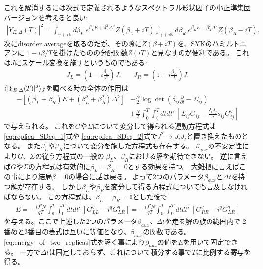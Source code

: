 これを解消するには次式で定義されるようなスペクトラル形状因子の小正準集団バージョンを考えると良い:
\begin{align}
	|Y_{E, \Delta}(T)|^2
	= \int_{\gamma + i\mathbb{R}}d\beta_L\ e^{\beta_LE + \beta_L^2\Delta^2}Z(\beta_L + iT)
	\int_{\gamma + i\mathbb{R}}d\beta_R\ e^{\beta_RE + \beta_R^2\Delta^2}Z(\beta_R - iT).
\end{align}
次にdisorder averageを取るのだが、その際に$Z(\beta + iT)$を、SYKのハミルトニアンに
$1 - i\beta / T$を掛けたものの分配関数$Z(iT)$と見なすのが便利である。
これは$J$にスケール変換を施すというものでもある:
\begin{align}
	J_L = \left(1 - i\frac{\beta_L}{T}\right)J,\hspace{20pt}
	J_R = \left(1 + i\frac{\beta_R}{T}\right)J.
\end{align}
$\langle |Y_{E,\Delta}(T)|^2 \rangle_J$を調べる時の全体の作用は
\begin{align}
	-\left[(\beta_L + \beta_R)E + (\beta_L^2 + \beta_R^2)\Delta^2\right]
	&-\frac{N}{2}\log\det\left(\delta_{ij}\frac{\partial}{\partial t}
	- \Sigma_{ij}\right)\nonumber\\
	&+\frac{N}{2}\int_0^T\int_0^T dtdt'\ 
		\left[\Sigma_{ij}G_{ij} - \frac{J_iJ_j}{q}s_{ij}G_{ij}^q\right]
\end{align}
で与えられる。
これを$G$や$\Sigma$について変分して得られる運動方程式は\eqref{eq:replica_SDeq_1}式や
\eqref{eq:replica_SDeq_2}式で$J^2\to J_iJ_j$と置き換えたものとなる。
また$\beta_L$や$\beta_R$について変分を施した方程式も存在する。
$\beta_{aux}$の不安定性により$G$、$\Sigma$の従う方程式の一般の
$\beta_L$、$\beta_R$における解を期待できない。
逆に言えば$G$や$\Sigma$の方程式は有効的に$\beta_L = \beta_R = 0$とする効果を持つ。
大雑把に言えばこの事により結局$\beta = 0$の場合に話は戻る。
よって2つのパラメータ$\beta_{aux}$と$\Delta t$を持つ解が存在する。
しかし$\beta_L$や$\beta_R$を変分して得る方程式についても言及しなければならない。
この方程式は、$\beta_L = \beta_R = 0$とした後で
\begin{align}
	E
	= -\frac{iJ^2N}{qT}\int_0^T\int_0^T dtdt'\ [G_{LL}^q - i^qG_{LR}^q]
	= -\frac{iJ^2N}{qT}\int_0^T\int_0^T dtdt'\ [G_{RR}^q - i^qG_{LR}^q]
	\label{eq:energy_of_two_replicas}
\end{align}
を与える。ここで上述した2つのパラメータ$\beta_{aux}$、$\Delta t$を走る解の族の範囲内で
2番めと3番目の表式は互いに等価となり、$\beta_{aux}$の関数である。
\eqref{eq:energy_of_two_replicas}式を解く事により$\beta_{aux}$の値を$E$を用いて固定できる。
一方で$\Delta t$は固定しておらず、これについて積分する事で$T$に比例する寄与を得る。

\pagebreak